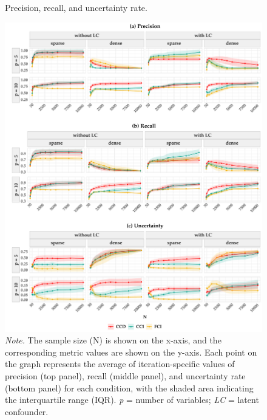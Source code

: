 \documentclass[twoside, 11pt]{article}
\begin{document}
\begin{figure}[!htbp]
    \centering
        \caption{Precision, recall, and uncertainty rate.}
        \vspace{1mm}
        \includegraphics[width=1\textwidth]{figures/prec-recall-uncer_alpha0.01.pdf}
        \vspace*{-4mm}
        \caption*{\small{\textit{Note.} The sample size (N) is shown on the x-axis, and the corresponding metric values are shown on the y-axis. Each point on the graph represents the average of iteration-specific values of precision (top panel), recall (middle panel), and uncertainty rate (bottom panel) for each condition, with the shaded area indicating the interquartile range (IQR). \textit{p} = number of variables; \textit{LC} = latent confounder.}}
    \label{fig:14}
\end{figure}
\end{document}
